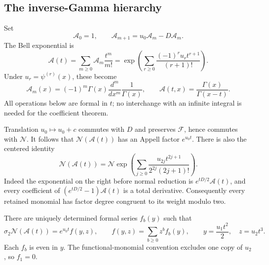 \documentclass[11pt,letterpaper]{article}
\numberwithin{equation}{section}
\theoremstyle{plain}
\theoremstyle{definition}
\theoremstyle{remark}
\newcommand{\NN}{\mathcal N}\newcommand{\HH}{\mathcal H}
\newcommand{\Acal}{\mathcal A}\newcommand{\cA}{\mathcal A}
\begin{document}
\subsection{The inverse-Gamma hierarchy}

Set
\begin{equation}\label{var:hierarchy}
 \Acal_0=1,\qquad \Acal_{m+1}=u_0\Acal_m-D\Acal_m.
\end{equation}
The Bell exponential is
\begin{equation}\label{var:Bell}
 \Acal(t)=\sum_{m\ge0}\Acal_m\frac{t^m}{m!}
 =\exp\left(\sum_{r\ge0}
         \frac{(-1)^ru_rt^{r+1}}{(r+1)!}\right).
\end{equation}
Under $u_r=\psi^{(r)}(x)$, these become
\[
 \Acal_m(x)=(-1)^m\Gamma(x)\frac{d^m}{dx^m}\frac1{\Gamma(x)},
 \qquad \Acal(t,x)=\frac{\Gamma(x)}{\Gamma(x-t)}.
\]
All operations below are formal in $t$; no interchange with an
infinite integral is needed for the coefficient theorem.

Translation $u_0\mapsto u_0+c$ commutes with $D$ and preserves
$\mathscr F$, hence commutes with $\NN$. It follows that
$\NN(\Acal(t))$ has an Appell factor $e^{u_0t}$.
There is also the centered identity
\begin{equation}\label{var:centered}
 \NN(\Acal(t))=
 \NN\exp\left(\sum_{j\ge0}
          \frac{u_{2j}t^{2j+1}}{2^{2j}(2j+1)!}\right).
\end{equation}
Indeed the exponential on the right before normal reduction is
$e^{tD/2}\Acal(t)$, and every coefficient of
$(e^{tD/2}-1)\Acal(t)$ is a total derivative.
Consequently every retained monomial has factor degree congruent to
its weight modulo two.

There are uniquely determined formal series $f_b(y)$ such that
\begin{equation}\label{var:fdefinition}
 \sigma_2\NN(\Acal(t))
 =e^{u_0t} f(y,z),\qquad
 f(y,z)=\sum_{b\ge0}z^bf_b(y),\qquad
 y=\frac{u_1t^2}{2},\quad z=u_2t^3.
\end{equation}
Each $f_b$ is even in $y$. The functional-monomial convention excludes
one copy of $u_2$, so $f_1=0$.
\end{document}
